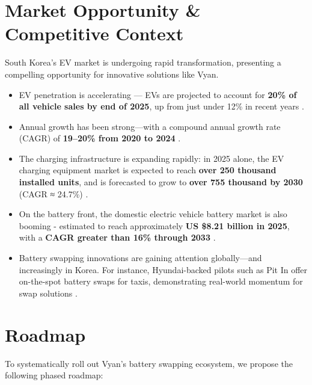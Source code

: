 \documentclass[12pt,a4paper]{article}
\begin{document}
\section{Market Opportunity \& Competitive Context}

South Korea's EV market is undergoing rapid transformation, presenting a compelling opportunity for innovative solutions like Vyan.

\begin{itemize}[leftmargin=1.5em]
  \item EV penetration is accelerating — EVs are projected to account for \textbf{20\% of all vehicle sales by end of 2025}, up from just under 12\% in recent years \cite{statista-ev-sales}.
  \item Annual growth has been strong—with a compound annual growth rate (CAGR) of \textbf{19–20\% from 2020 to 2024} \cite{iea-global-ev}.
  \item The charging infrastructure is expanding rapidly: in 2025 alone, the EV charging equipment market is expected to reach \textbf{over 250 thousand installed units}, and is forecasted to grow to \textbf{over 755 thousand by 2030} (CAGR ≈ 24.7\%) \cite{mordor-charging}.
  \item On the battery front, the domestic electric vehicle battery market is also booming - estimated to reach approximately \textbf{US \$8.21 billion in 2025}, with a \textbf{CAGR greater than 16\% through 2033} \cite{mordor-battery}.
  \item Battery swapping innovations are gaining attention globally—and increasingly in Korea. For instance, Hyundai-backed pilots such as Pit In offer on-the-spot battery swaps for taxis, demonstrating real-world momentum for swap solutions \cite{hyundai-pitin}.
\end{itemize}

\section{Roadmap}
To systematically roll out Vyan’s battery swapping ecosystem, we propose the following phased roadmap:
\end{document}
